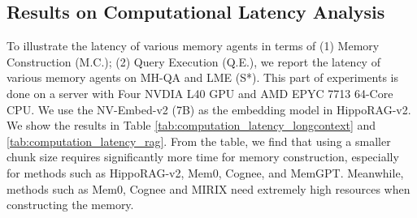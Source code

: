 \subsection{Results on Computational Latency Analysis}
\label{sub:latency_analysis}

To illustrate the latency of various memory agents in terms of (1) Memory Construction (M.C.); (2) Query Execution (Q.E.), we report the latency of various memory agents on MH-QA and LME (S*). This part of experiments is done on a server with Four NVDIA L40 GPU and AMD EPYC 7713 64-Core CPU. 
We use the NV-Embed-v2 (7B) as the embedding model in HippoRAG-v2. We show the results in Table \ref{tab:computation_latency_longcontext} and \ref{tab:computation_latency_rag}. From the table, we find that using a smaller chunk size requires significantly more time for memory construction, especially for methods such as HippoRAG-v2, Mem0, Cognee, and MemGPT. Meanwhile, methods such as Mem0, Cognee and MIRIX need extremely high resources when constructing the memory. 


